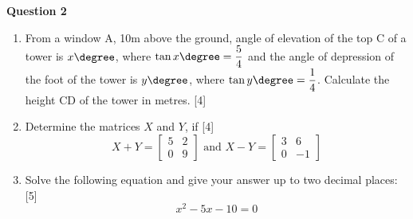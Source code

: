 \newpage
\par
\noindent
\textbf{Question 2}\\
\begin{enumerate}[label=(\roman*)]

    \item From a window A, 10m above the ground, angle of elevation of 
        the top C of a tower is $x\degree$, where $\tan x\degree = \dfrac54$ 
        and the angle of depression of the foot of the tower is $y\degree$,
        where $\tan y\degree = \dfrac14$. Calculate the height CD of the 
        tower in metres.
        \hfill[4]

    \item Determine the matrices $X$ and $Y$, if \hfill [4]
        \[
            X + Y = \begin{bmatrix*} 5 & 2 \\ 0 & 9 \end{bmatrix*}
            \text{ and }
            X - Y = \begin{bmatrix*} 3 & 6 \\ 0 & -1 \end{bmatrix*}
        \]

    \item Solve the following equation and give your answer up to 
        two decimal places: \hfill [5]
        \[
            x^2 - 5x - 10 = 0
        \]

\end{enumerate}
